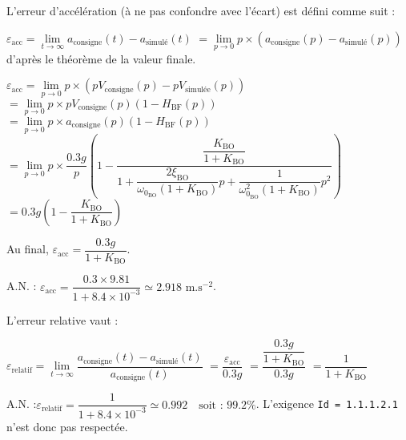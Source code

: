 \ifprof
\begin{corrige}
L'erreur d'accélération (à ne pas confondre avec l'écart) est défini comme suit :

$ \varepsilon_\text{acc} = \lim\limits_{t \to \infty} a_\text{consigne}(t) - a_\text{simulé}(t)$
 $= \lim\limits_{p \to 0} p \times \left(  a_\text{consigne}(p) - a_\text{simulé}(p)\right)$
 d'après le théorème de la valeur finale.

$ \varepsilon_\text{acc}= \lim\limits_{p \to 0} p \times \left( p V_\text{consigne}(p) - p V_\text{simulée}(p) \right)$
 $= \lim\limits_{p \to 0} p \times p V_\text{consigne}(p) \left( 1 - H_\text{BF}(p) \right)$
 $= \lim\limits_{p \to 0} p \times a_\text{consigne}(p) \left( 1 - H_\text{BF}(p) \right)$
 $= \lim\limits_{p \to 0} {p} \times \dfrac{0.3 g}{{p}} \left( 1 - \dfrac{\dfrac{K_\text{BO}}{1+K_\text{BO}}}{ 1 + \dfrac{2 \xi_\text{BO}}{\omega_{0_\text{BO}} (1 + K_\text{BO})}p + \dfrac{1}{\omega^2_{0_\text{BO}}(1 + K_\text{BO})}p^2} \right)$
  $= 0.3 g\left( 1 -\dfrac{K_\text{BO}}{1+K_\text{BO}} \right)$

Au final, $\varepsilon_\text{acc} =  \dfrac{0.3 g}{1+K_\text{BO}} $.

A.N. : $ \varepsilon_\text{acc} = \dfrac{0.3 \times 9.81}{1 + 8.4 \times 10^{-3}} \simeq 2.918 \text{ m.s$^{-2}$}$.

\end{corrige}
\else
\fi


\ifprof
\begin{corrige}
L'erreur relative vaut :

$ \varepsilon_\text{relatif} = \lim\limits_{t \to \infty}\dfrac{a_\text{consigne}(t) - a_\text{simulé}(t)}{a_\text{consigne}(t)}$
 $= \dfrac{\varepsilon_\text{acc}}{0.3 g}$
 $= \dfrac{\dfrac{{0.3 g}}{1+K_\text{BO}}}{{0.3 g}}$
 $= \dfrac{1}{1+K_\text{BO}}$

A.N. :$  \varepsilon_\text{relatif} = \dfrac{1}{1 + 8.4 \times 10^{-3}} \simeq 0.992 \quad \text{soit : } 99.2\%$. L'exigence \texttt{Id = 1.1.1.2.1} n'est donc pas respectée.
\end{corrige}
\else
\fi

